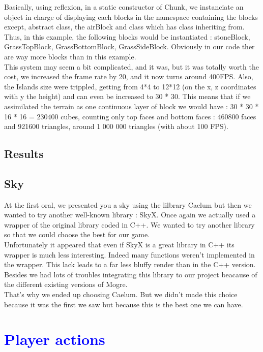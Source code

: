 \documentclass[article]{report}             %
\begin{document}
Basically, using reflexion, in a static constructor of Chunk, we instanciate an object in charge of displaying each blocks in the namespace containing the blocks except, abstract class, the airBlock and class which has class inheriting from.\\
Thus, in this example, the following blocks would be instantiated : stoneBlock, GrassTopBlock, GrassBottomBlock, GrassSideBlock. Obviously in our code ther are way more blocks 
than in this example.\\


This system may seem a bit complicated, and it was, but it was totally worth the cost, we increased the frame rate by 20, and it now turns around 400FPS. Also, the Islands size were trippled, getting from 4*4 to 12*12 (on the x, z coordinates with y the height) and can even be increased to 30 * 30. This means that if we assimilated the terrain as one continuous layer of block we would have : 	30 * 30 * 16 * 16 = 230400 cubes, counting only top faces and bottom faces : 460800 faces and 921600 triangles, around 1 000 000 triangles (with about 100 FPS).
			\section{Results}
			
			\section{Sky}
				At the first oral, we presented you a sky using the lilbrary Caelum but then we wanted to try another well-known library : SkyX. Once again we actually used a wrapper of the original library coded in C++. We wanted to try another library so that we could choose the best for our game.\\
				
Unfortunately it appeared that even if SkyX is a great library in C++ its wrapper is much less interesting. Indeed many functions weren't implemented in the wrapper. This lack leads to a far less bluffy render than in the C++ version. Besides we had lots of troubles integrating this library to our project beacause of the different existing versions of Mogre.\\

That's why we ended up choosing Caelum. But we didn't made this choice because it was the first we saw but because this is the best one we can have.

		\chapter{\textcolor{blue}{Player actions}}
\end{document}

